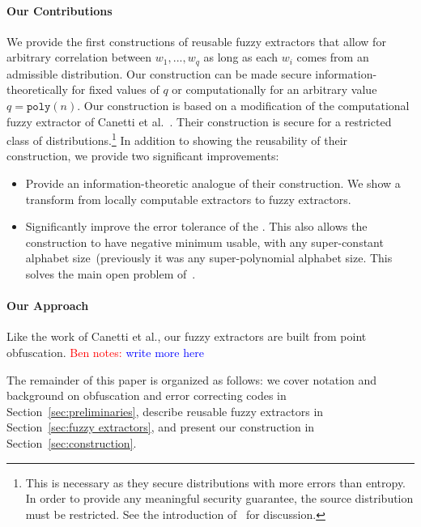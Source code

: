 \documentclass[11pt]{article}
\newcommand{\secref}[1]{\mbox{Section~\ref{#1}}}
\newcommand{\poly}{\ensuremath{\mathtt{poly}}\xspace}
\newcommand{\authnote}[2]{{\textcolor{red}{\textsf{#1 notes: }\textcolor{blue}{ #2}}\marginpar{\textcolor{red}{\textbf{!!!!!}}}}}
\newcommand{\authnote}[2]{}
\newcommand{\bnote}[1]{{\authnote{Ben}{#1}}}
\begin{document}
\paragraph{Our Contributions}
We provide the first constructions of reusable fuzzy extractors that allow for arbitrary correlation between $w_1,..., w_q$ as long as each $w_i$ comes from an admissible distribution.  Our construction can be made secure information-theoretically for fixed values of $q$ or computationally for an arbitrary value $q = \poly(n)$.  Our construction is based on a modification of the computational fuzzy extractor of Canetti et al.~\cite[Construction 5.2]{canetti2014key}.  Their construction is secure for a restricted class of distributions.\footnote{This is necessary as they secure distributions with more errors than entropy.  In order to provide any meaningful security guarantee, the source distribution must be restricted.  See the introduction of~\cite{canetti2014key} for discussion.}  In addition to showing the reusability of their construction, we provide two significant improvements:
\begin{itemize}
\item Provide an information-theoretic analogue of their construction.  We show a transform from locally computable extractors to fuzzy extractors.
\item Significantly improve the error tolerance of the \cite[Construction 5.2]{canetti2014key}.  This also allows the construction to have negative minimum usable, with any super-constant alphabet size~(previously it was any super-polynomial alphabet size.  This solves the main open problem of~\cite{canetti2014key}.
\end{itemize}

\paragraph{Our Approach}
Like the work of Canetti et al., our fuzzy extractors are built from point obfuscation.  \bnote{write more here}

\medskip

The remainder of this paper is organized as follows: we cover notation and background on obfuscation and error correcting codes in \secref{sec:preliminaries}, describe reusable fuzzy extractors in \secref{sec:fuzzy extractors}, and present our construction in \secref{sec:construction}.
\end{document}
